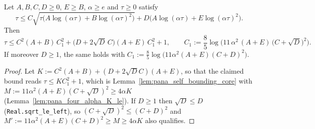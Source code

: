 \begin{lemma}\label{lem:self_bounding}
\leanok
Let $A, B, C, D \ge 0$, $E \ge B$, $\alpha \ge e$ and $\tau \ge 0$ satisfy
\[
  \tau \le C\sqrt{\tau\big(A\log(\alpha\tau) + B\log(\alpha\tau)^2\big)}
  + D\big(A\log(\alpha\tau) + E\log(\alpha\tau)^2\big) .
\]
Then
\[
  \tau \le C^2(A + B)\,C_1^2 + \big(D + 2\sqrt D\,C\big)(A + E)\,C_1^2 + 1,
  \qquad
  C_1 := \frac85\log\Big(11\,\alpha^2\,(A + E)\,\big(C + \sqrt D\big)^2\Big) .
\]
If moreover $D \ge 1$, the same holds with $C_1 := \frac85\log\big(11\alpha^2(A+E)(C + D)^2\big)$.
\end{lemma}

\begin{proof}
\leanok
Let $K := C^2(A+B) + (D + 2\sqrt D C)(A+E)$, so that the claimed bound reads
$\tau \le KC_1^2 + 1$, which is Lemma~\ref{lem:pana_self_bounding_core} with
$M := 11\alpha^2(A+E)(C+\sqrt D)^2 \ge 4\alpha K$ (Lemma~\ref{lem:pana_four_alpha_K_le}).
If $D \ge 1$ then $\sqrt D \le D$ (\texttt{Real.sqrt\_le\_left}), so
$(C + \sqrt D)^2 \le (C + D)^2$ and $M' := 11\alpha^2(A+E)(C+D)^2 \ge M \ge 4\alpha K$ also
qualifies.
\end{proof}

